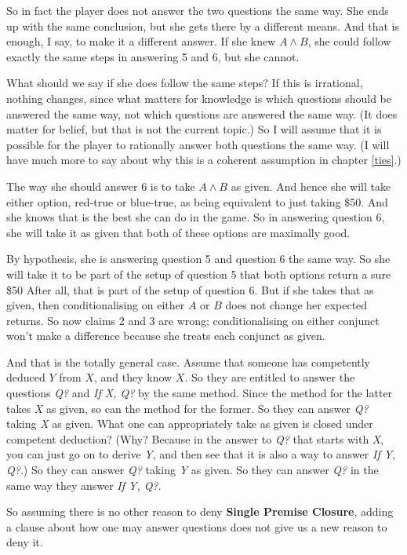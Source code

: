 \documentclass[11pt,]{book}
\begin{document}
So in fact the player does not answer the two questions the same way. She ends up with the same conclusion, but she gets there by a different means. And that is enough, I say, to make it a different answer. If she knew \(A \wedge B\), she could follow exactly the same steps in answering 5 and 6, but she cannot.

What should we say if she does follow the same steps? If this is irrational, nothing changes, since what matters for knowledge is which questions should be answered the same way, not which questions are answered the same way. (It does matter for belief, but that is not the current topic.) So I will assume that it is possible for the player to rationally answer both questions the same way. (I will have much more to say about why this is a coherent assumption in chapter \ref{ties}.)

The way she should answer 6 is to take \(A \wedge B\) as given. And hence she will take either option, red-true or blue-true, as being equivalent to just taking \$50. And she knows that is the best she can do in the game. So in answering question 6, she will take it as given that both of these options are maximally good.

By hypothesis, she is answering question 5 and question 6 the same way. So she will take it to be part of the setup of question 5 that both options return a sure \$50 After all, that is part of the setup of question 6. But if she takes that as given, then conditionalising on either \(A\) or \(B\) does not change her expected returns. So now claims 2 and 3 are wrong; conditionalising on either conjunct won't make a difference because she treats each conjunct as given.

And that is the totally general case. Assume that someone has competently deduced \(Y\) from \(X\), and they know \(X\). So they are entitled to answer the questions \emph{Q?} and \emph{If X, Q?} by the same method. Since the method for the latter takes \emph{X} as given, so can the method for the former. So they can answer \emph{Q?} taking \emph{X} as given. What one can appropriately take as given is closed under competent deduction? (Why? Because in the answer to \emph{Q?} that starts with \emph{X}, you can just go on to derive \emph{Y}, and then see that it is also a way to answer \emph{If Y, Q?}.) So they can answer \emph{Q?} taking \emph{Y} as given. So they can answer \emph{Q?} in the same way they answer \emph{If Y, Q?}.

So assuming there is no other reason to deny \textbf{Single Premise Closure}, adding a clause about how one may answer questions does not give us a new reason to deny it.
\end{document}
